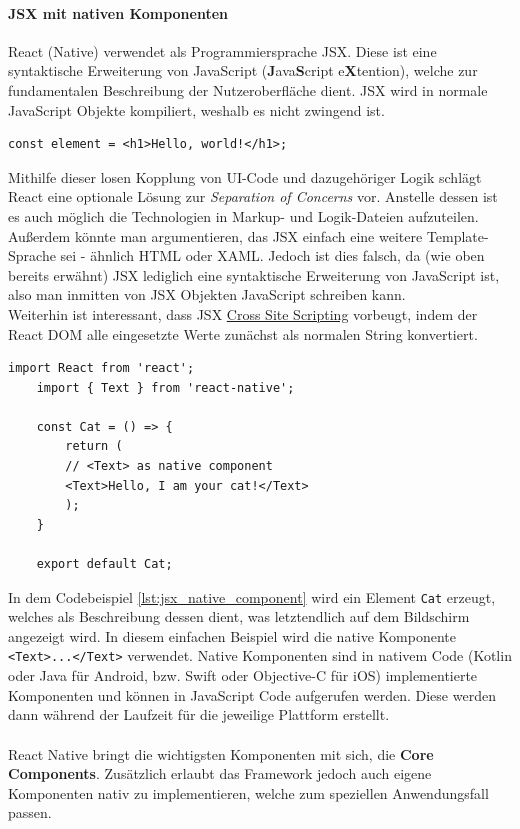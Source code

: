 \paragraph{JSX mit nativen Komponenten}
React (Native) verwendet als Programmiersprache JSX. Diese ist eine syntaktische Erweiterung von JavaScript (\textbf{J}ava\textbf{S}cript e\textbf{X}tention), welche zur fundamentalen Beschreibung der Nutzeroberfläche dient. JSX wird in normale JavaScript Objekte kompiliert, weshalb es nicht zwingend ist. \\
\begin{lstlisting}[caption=JSX Hello World Element]
	const element = <h1>Hello, world!</h1>;
\end{lstlisting}
Mithilfe dieser losen Kopplung von UI-Code und dazugehöriger Logik schlägt React eine optionale Lösung zur \textit{Separation of Concerns} vor. Anstelle dessen ist es auch möglich die Technologien in Markup- und Logik-Dateien aufzuteilen. \\
Außerdem könnte man argumentieren, das JSX einfach eine weitere Template-Sprache sei - ähnlich HTML oder XAML. Jedoch ist dies falsch, da (wie oben bereits erwähnt) JSX lediglich eine syntaktische Erweiterung von JavaScript ist, also man inmitten von JSX Objekten JavaScript schreiben kann.\\
Weiterhin ist interessant, dass JSX \href{https://owasp.org/www-community/attacks/xss/}{Cross Site Scripting} vorbeugt, indem der React DOM alle eingesetzte Werte zunächst als normalen String konvertiert. \cite{react2021}
\begin{lstlisting}[caption=Native Komponenten, label=lst:jsx_native_component]
	import React from 'react';
	import { Text } from 'react-native';
	
	const Cat = () => {
		return (
		// <Text> as native component
		<Text>Hello, I am your cat!</Text>
		);
	}
	
	export default Cat;
\end{lstlisting}
In dem Codebeispiel \ref{lst:jsx_native_component} wird ein Element \texttt{Cat} erzeugt, welches als Beschreibung dessen dient, was letztendlich auf dem Bildschirm angezeigt wird. 
In diesem einfachen Beispiel wird die native Komponente \texttt{<Text>...</Text>} verwendet. 
Native Komponenten sind in nativem Code (Kotlin oder Java für Android, bzw. Swift oder Objective-C für iOS) implementierte Komponenten und können in JavaScript Code aufgerufen werden. 
Diese werden dann während der Laufzeit für die jeweilige Plattform erstellt.\\
\\
React Native bringt die wichtigsten Komponenten mit sich, die \textbf{Core Components}. Zusätzlich erlaubt das Framework jedoch auch eigene Komponenten nativ zu implementieren, welche zum speziellen Anwendungsfall passen.\\

